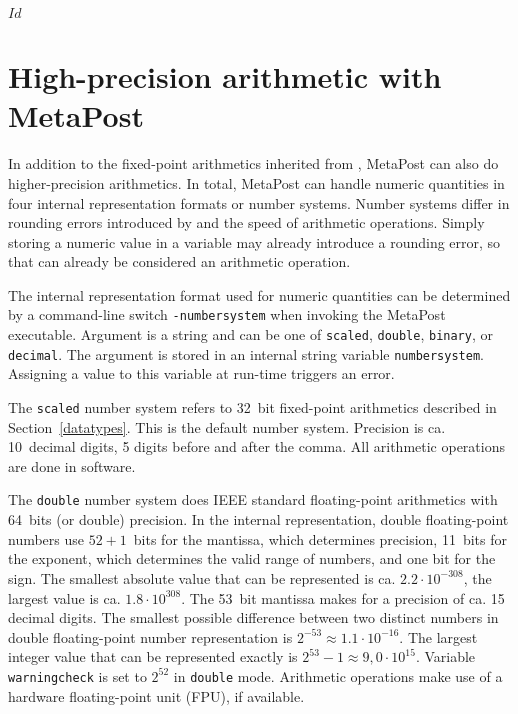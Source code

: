 \svnInfo $Id$
\section{High-precision arithmetic with MetaPost}
\label{hparith}

In addition to the fixed-point arithmetics inherited from \MF, MetaPost
can also do higher-precision arithmetics.  In total, MetaPost can handle
numeric quantities in four internal representation formats or number
systems.  Number systems differ in rounding errors
introduced by and the speed of arithmetic operations.  Simply storing a
numeric value in a variable may already introduce a rounding error, so
that can already be considered an arithmetic operation.

The internal representation format used for numeric quantities can be
determined by a command-line switch
\texttt{-numbersystem}
when invoking the MetaPost executable.  Argument is a string and can be
one of \texttt{scaled}, \texttt{double}, \texttt{binary}, or
\texttt{decimal}.  The argument is stored in an internal string variable
\texttt{numbersystem}\label{Dnumbersystem}.
Assigning a value to this variable at run-time triggers an error.

The \texttt{scaled} number system refers
to 32~bit fixed-point arithmetics described in Section~\ref{datatypes}.
This is the default number system.  Precision is ca. 10~decimal digits,
5 digits before and after the comma.  All arithmetic operations are done
in software.

The \texttt{double} number system does
IEEE standard floating-point arithmetics with 64~bits (or double)
precision.  In the internal representation, double floating-point
numbers use $52+1$~bits for the mantissa, which determines precision,
11~bits for the exponent, which determines the valid range of numbers,
and one bit for the sign.  The smallest absolute value that can be
represented is ca. $2.2\cdot10^{-308}$, the largest value is
ca. $1.8\cdot10^{308}$.  The 53~bit mantissa makes for a precision of
ca. 15 decimal digits.  The smallest possible difference between two
distinct numbers in double floating-point number representation is
$2^{-53} \approx 1.1\cdot10^{-16}$.  The largest integer value that can
be represented exactly is $2^{53}-1 \approx 9,0\cdot10^{15}$.  Variable
\texttt{warningcheck} is set
to $2^{52}$ in \texttt{double} mode.  Arithmetic operations make use of
a hardware floating-point unit (FPU), if available.

